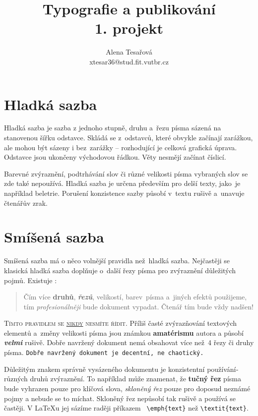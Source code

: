 \documentclass[11pt,twocolumn,a4paper]{article}
\author{Alena Tesařová \\ xtesar36@stud.fit.vutbr.cz}
\date{}
\title{Typografie a publikování \\
		1. projekt \\}
\begin{document}
\maketitle

\section{Hladká sazba}

Hladká sazba je sazba z jednoho stupně, druhu a~řezu pí­sma sázená na stanovenou šířku odstavce. Skládá se z~odstavců, které obvykle začínají­ zarážkou, ale mohou být sázeny i bez~zarážky -- rozhodují­cí­ je celková grafická úprava. Odstavce jsou ukončeny východovou řádkou. Věty nesmějí začínat číslicí.

Barevné zvýraznění­, podtrhávání­ slov či různé velikosti písma vybraných slov se zde také nepoužívá. Hladká sazba je určena především pro delší­ texty, jako~je napří­klad beletrie. Porušení­ konzistence sazby působí v~textu rušivě a~unavuje čtenářův zrak.

\section{Smíšená sazba}

Smíšená sazba má o něco volnější pravidla než~hladká sazba. Nejčastěji se klasická hladká sazba doplňuje o~další řezy písma pro zvýraznění důležitých pojmů. Existuje : \\

\begin{quotation}
Čí­m ví­ce \textbf{druhů}, \textit{\textbf{řezů}}, {\scriptsize velikostí}, barev~písma a~jiných efektů použijeme, tím \emph{profe\-sionálněji} bude  dokument vypadat. Čtenář tím bude vždy {\Huge nadšen!} \\
\end{quotation}


\textsc{Tí­mto pravidlem se \underline{nikdy} nesmí­te ří­dit.} Příliš časté zvýrazňování textových elementů a~změny velikosti {\tiny pí­sma} jsou  {\LARGE známkou \textbf{amatérismu}} autora a působí­ \emph{\textbf{velmi}} rušivě. Dobře navržený dokument nemá obsahovat ví­ce než~4 řezy či druhy pí­sma. \texttt{Dobře navržený dokument je decentní­, ne chaotický.}

Důležitým znakem správně vysázeného dokumentu je konzistentní použí­vání­ různých druhů zvýraznění­. To napří­klad může znamenat, že \textbf{tučný řez} pí­sma bude vyhrazen pouze pro klíčová slova, \emph{skloněný řez} pouze pro doposud neznámé pojmy a nebude se to míchat. Skloněný řez nepůsobí­ tak rušivě a použí­vá se častěji. V \LaTeX u jej sází­me raději pří­kazem \verb| \emph{text}| než \verb|\textit{text}|.
\end{document}
